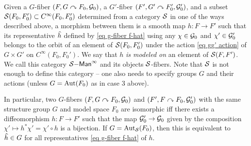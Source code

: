 \begin{defn}\label{def S-fibers}
    Given a $G$-fiber $(\tuple{F,G\acts F_0,\calG_0})$, a $G'$-fiber $(\tuple{F',G'\acts F_0',\calG_0'})$, and a subset $\mathcal{S}(F_0,F_0')\subset C^\infty(F_0,F_0')$ determined from a category $\mathcal{S}$ in one of the ways described above, a morphism between them is a smooth map $h: F\to F'$ such that its representative $\wh{h}$ defined by \eqref{eq g-fiber f-hat} using any $\chi\in\mathcal{G}_0$ and $\chi'\in\mathcal{G}_0'$ belongs to the orbit of an element of $\mathcal{S}(F_0,F_0')$ under the action \eqref{eq gg' action} of $G\times G'$ on $C^\infty(F_0,F_0')$. We say that $h$ \emph{is modeled on} an element of $\mathcal{S}(F,F')$. We call this category $\mathcal{S}\mathsf{-Man}^\infty$ and its objects $\mathcal{S}$-fibers. Note that $\mathcal{S}$ is not enough to define this category -- one also needs to specify groups $G$ and their actions (unless $G=\operatorname{Aut}(F_0)$ as in case 3 above).

    In particular, two $G$-fibers $(F,G\curvearrowright F_0,\mathcal{G}_0)$ and $(F',F\curvearrowright F_0,\mathcal{G}_0')$ with the same structure group $G$ and model space $F_0$ are isomorphic iff there exists a diffeomorphism $h:F\to F'$ such that the map $\mathcal{G}_0'\to \mathcal{G}_0$ given by the composition $\chi'\mapsto h^\ast \chi'=\chi'\circ h$ is a bijection. If $G=\operatorname{Aut}_{\mathcal{S}}(F_0)$, then this is equivalent to $\wh{h}\in G$ for all representatives \eqref{eq g-fiber f-hat} of $h$.
\end{defn}

